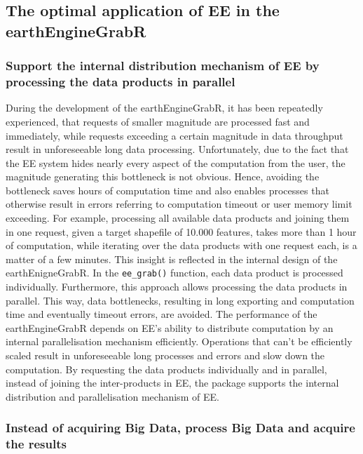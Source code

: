 \subsection{The optimal application of EE in the earthEngineGrabR}

\subsubsection{Support the internal distribution mechanism of EE by processing the data products in parallel}

During the development of the earthEngineGrabR, it has been repeatedly experienced, that requests of smaller magnitude are processed fast and immediately, while requests exceeding a certain magnitude in data throughput result in unforeseeable long data processing. Unfortunately, due to the fact that the EE system hides nearly every aspect of the computation from the user, the magnitude generating this bottleneck is not obvious. Hence, avoiding the bottleneck saves hours of computation time and also enables processes that otherwise result in errors referring to computation timeout or user memory limit exceeding. For example, processing all available data products and joining them in one request, given a target shapefile of 10.000 features, takes more than 1 hour of computation, while iterating over the data products with one request each, is a matter of a few minutes. This insight is reflected in the internal design of the earthEnigneGrabR. In the \texttt{ee\_grab()} function, each data product is processed individually. Furthermore, this approach allows processing the data products in parallel. This way, data bottlenecks, resulting in long exporting and computation time and eventually timeout errors, are avoided. The performance of the earthEngineGrabR depends on EE's ability to distribute computation by an internal parallelisation mechanism efficiently. Operations that can't be efficiently scaled result in unforeseeable long processes and errors and slow down the computation. By requesting the data products individually and in parallel, instead of joining the inter-products in EE, the package supports the internal distribution and parallelisation mechanism of EE.

\subsubsection{Instead of acquiring Big Data, process Big Data and acquire the results}

